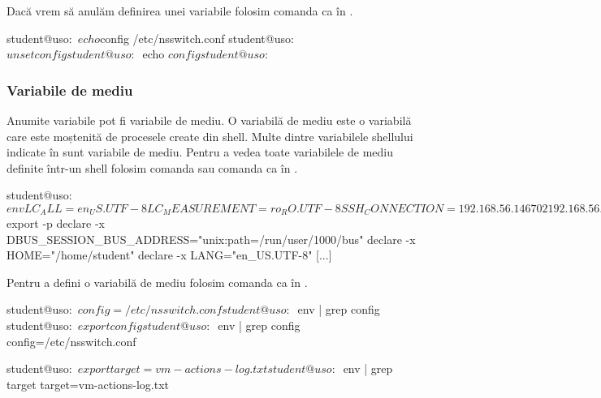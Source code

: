 
Dacă vrem să anulăm definirea unei variabile folosim comanda  ca în .

\begin{screen}[caption={Anularea definirii unei variabile},label={lst:cli:unset}]
student@uso:~$ echo $config
/etc/nsswitch.conf
student@uso:~$ unset config
student@uso:~$ echo $config

student@uso:~$
\end{screen}

\subsubsection{Variabile de mediu}
\label{sec:cli:shell-func:vars:env}

Anumite variabile pot fi variabile de mediu. O variabilă de mediu este o
variabilă care este moștenită de procesele create din shell. Multe dintre
variabilele shellului indicate în  sunt variabile de mediu. Pentru
a vedea toate variabilele de mediu definite într-un shell folosim comanda  sau comanda  ca în .

\begin{screen}[caption={Afișarea variabilelor de mediu},label={lst:cli:print-env-vars}]
student@uso:~$ env
LC_ALL=en_US.UTF-8
LC_MEASUREMENT=ro_RO.UTF-8
SSH_CONNECTION=192.168.56.1 46702 192.168.56.101 22
[...]

student@uso:~$ export -p
declare -x DBUS_SESSION_BUS_ADDRESS="unix:path=/run/user/1000/bus"
declare -x HOME="/home/student"
declare -x LANG="en_US.UTF-8"
[...]
\end{screen}

Pentru a defini o variabilă de mediu folosim comanda  ca în .

\begin{screen}[caption={Definirea unei variabile de mediu},label={lst:cli:export}]
student@uso:~$ config=/etc/nsswitch.conf
student@uso:~$ env | grep config
student@uso:~$ export config
student@uso:~$ env | grep config
config=/etc/nsswitch.conf

student@uso:~$ export target=vm-actions-log.txt
student@uso:~$ env | grep target
target=vm-actions-log.txt
\end{screen}

